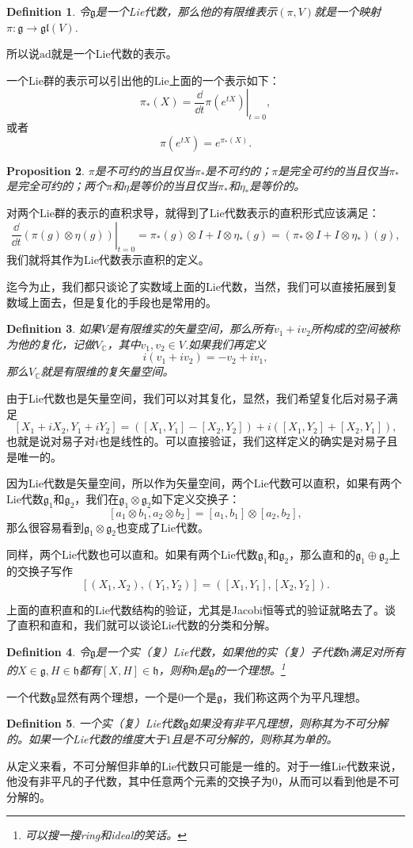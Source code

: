 \documentclass[9pt]{extbook}
\theoremstyle{plain}
\newtheorem{defi}{Definition}
\newtheorem{pro}[defi]{Proposition}
\newcommand{\cc}{\mathbb{C}}
\newcommand{\lag}{{\mathfrak{g}}}  %
\newcommand{\ad}{{\mathrm{ad}}}
\begin{document}
\begin{defi}
令$\lag$是一个Lie代数，那么他的有限维表示$(\pi,V)$就是一个映射$\pi:\lag\to\mathfrak{gl}(V)$.
\end{defi}

所以说$\ad$就是一个Lie代数的表示。

一个Lie群的表示可以引出他的Lie上面的一个表示如下：
\[
	\pi_*(X)=\left.\frac{\dd}{\dd t}\pi(e^{tX})\right|_{t=0},
\]
或者
\[
	\pi(e^{tX})=e^{\pi_*(X)}.
\]

\begin{pro}
$\pi$是不可约的当且仅当$\pi_*$是不可约的；$\pi$是完全可约的当且仅当$\pi_*$是完全可约的；两个$\pi$和$\eta$是等价的当且仅当$\pi_*$和$\eta_*$是等价的。
\end{pro}

对两个Lie群的表示的直积求导，就得到了Lie代数表示的直积形式应该满足：
\[
	\left.\frac{\dd}{\dd t}(\pi(g)\otimes \eta(g))\right|_{t=0}=\pi_*(g)\otimes I+I\otimes \eta_*(g)=(\pi_*\otimes I+I\otimes \eta_*)(g),
\]
我们就将其作为Lie代数表示直积的定义。

迄今为止，我们都只谈论了实数域上面的Lie代数，当然，我们可以直接拓展到复数域上面去，但是复化的手段也是常用的。

\begin{defi}
如果$V$是有限维实的矢量空间，那么所有$v_1+iv_2$所构成的空间被称为他的复化，记做$V_\cc$，其中$v_1,v_2\in V$.如果我们再定义
\[
i(v_1+iv_2)=-v_2+iv_1,
\]
那么$V_\cc$就是有限维的复矢量空间。
\end{defi}

由于Lie代数也是矢量空间，我们可以对其复化，显然，我们希望复化后对易子满足
\[
[X_1+iX_2,Y_1+iY_2]=([X_1,Y_1]-[X_2,Y_2])+i([X_1,Y_2]+[X_2,Y_1]),
\]
也就是说对易子对$i$也是线性的。可以直接验证，我们这样定义的确实是对易子且是唯一的。

因为Lie代数是矢量空间，所以作为矢量空间，两个Lie代数可以直积，如果有两个Lie代数$\lag_1$和$\lag_2$，我们在$\lag_1\otimes\lag_2$如下定义交换子：
\[
[a_1\otimes b_1,a_2\otimes b_2]=[a_1,b_1]\otimes [a_2,b_2],
\]
那么很容易看到$\lag_1\otimes\lag_2$也变成了Lie代数。

同样，两个Lie代数也可以直和。如果有两个Lie代数$\lag_1$和$\lag_2$，那么直和的$\lag_1\oplus\lag_2$上的交换子写作
\[
	[(X_1,X_2),(Y_1,Y_2)]=([X_1,Y_1],[X_2,Y_2]).
\]

上面的直积直和的Lie代数结构的验证，尤其是Jacobi恒等式的验证就略去了。谈了直积和直和，我们就可以谈论Lie代数的分类和分解。

\begin{defi}
令$\lag$是一个实（复）Lie代数，如果他的实（复）子代数$\mathfrak{h}$满足对所有的$X\in \lag,H \in \mathfrak{h}$都有$[X,H]\in \mathfrak{h}$，则称$\mathfrak{h}$是$\lag$的一个理想。\footnote{可以搜一搜ring和ideal的笑话。}
\end{defi}
一个代数$\lag$显然有两个理想，一个是$0$一个是$\lag$，我们称这两个为平凡理想。
\begin{defi}
一个实（复）Lie代数$\lag$如果没有非平凡理想，则称其为不可分解的。如果一个Lie代数的维度大于$1$且是不可分解的，则称其为单的。
\end{defi}
从定义来看，不可分解但非单的Lie代数只可能是一维的。对于一维Lie代数来说，他没有非平凡的子代数，其中任意两个元素的交换子为0，从而可以看到他是不可分解的。
\end{document}
